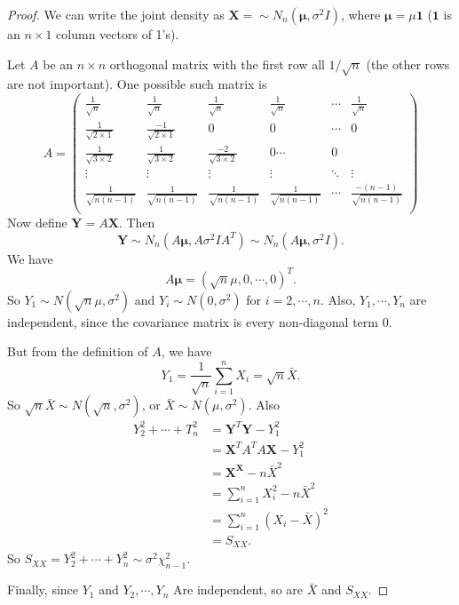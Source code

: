\documentclass[a4paper]{article}
\begin{document}
\begin{proof}
  We can write the joint density as $\mathbf{X} = \sim N_n(\boldsymbol\mu, \sigma^2I)$, where $\boldsymbol\mu = \mu \mathbf{1}$ ($\mathbf{1}$ is an $n\times 1$ column vectors of 1's).

  Let $A$ be an $n\times n$ orthogonal matrix with the first row all $1/\sqrt{n}$ (the other rows are not important). One possible such matrix is
  \[
    A =
    \begin{pmatrix}
      \frac{1}{\sqrt{n}} & \frac{1}{\sqrt{n}} & \frac{1}{\sqrt{n}} & \frac{1}{\sqrt{n}} & \cdots & \frac{1}{\sqrt{n}}\\
      \frac{1}{\sqrt{2\times 1}} & \frac{-1}{\sqrt{2\times 1}} & 0 & 0 & \cdots & 0\\
      \frac{1}{\sqrt{3\times 2}} & \frac{1}{\sqrt{3\times 2}} & \frac{-2}{\sqrt{3\times 2}} & 0 \cdots & 0\\
      \vdots & \vdots & \vdots & \vdots & \ddots & \vdots \\
      \frac{1}{\sqrt{n(n - 1)}} & \frac{1}{\sqrt{n(n - 1)}} & \frac{1}{\sqrt{n(n - 1)}} & \frac{1}{\sqrt{n(n - 1)}} & \cdots & \frac{-(n - 1)}{\sqrt{n(n - 1)}} \\
    \end{pmatrix}
  \]
  Now define $\mathbf{Y} = A\mathbf{X}$. Then
  \[
    \mathbf{Y} \sim N_n(A\boldsymbol\mu, A\sigma^2IA^T) \sim N_n(A\boldsymbol\mu, \sigma^2 I).
  \]
  We have
  \[
    A\boldsymbol\mu = (\sqrt{n}\mu, 0, \cdots, 0)^T.
  \]
  So $Y_1 \sim N(\sqrt{n}\mu, \sigma^2)$ and $Y_i \sim N(0, \sigma^2)$ for $i = 2, \cdots, n$. Also, $Y_1, \cdots, Y_n$ are independent, since the covariance matrix is every non-diagonal term $0$.

  But from the definition of $A$, we have
  \[
    Y_1 = \frac{1}{\sqrt{n}}\sum_{i = 1}^n X_i = \sqrt{n} \bar X.
  \]
  So $\sqrt{n} \bar X \sim N(\sqrt{n}, \sigma^2)$, or $\bar X \sim N(\mu, \sigma^2)$. Also
  \begin{align*}
    Y_2^2 + \cdots + T_n^2 &= \mathbf{Y}^T\mathbf{Y} - Y_1^2\\
    &= \mathbf{X}^TA^TA\mathbf{X} - Y_1^2\\
    &= \mathbf{X}^\mathbf{X} - n\bar X^2\\
    &= \sum_{i = 1}^n X_i^2 - n\bar X^2\\
    &= \sum_{i = 1}^n (X_i - \bar X)^2 \\
    &= S_{XX}.
  \end{align*}
  So $S_{XX} = Y_2^2 + \cdots + Y^2_n \sim \sigma^2 \chi_{n - 1}^2$.

  Finally, since $Y_1$ and $Y_2, \cdots, Y_n$ Are independent, so are $\bar X$ and $S_{XX}$.
\end{proof}
\end{document}
